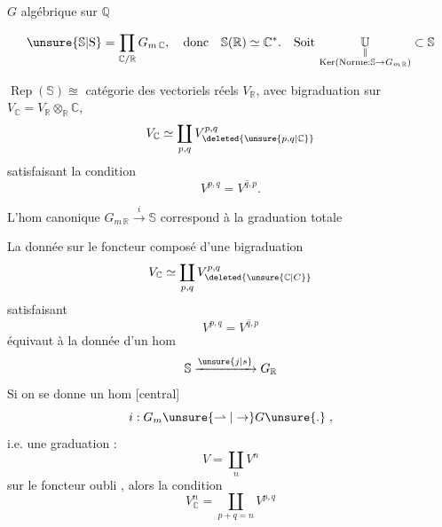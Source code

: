 $G$  algébrique sur $\mathbb{Q}$

\[
\unsure{\mathbb{S}|\mathrm{S}}=\prod_{\mathbb{C}/\mathbb{R}}G_{m\,\mathbb{C}},\quad
\text{donc}\quad \mathbb{S}(\mathbb{R})\simeq\mathbb{C}^{*}.\quad
\text{Soit }\underset{\substack{\Vert\\
\operatorname{Ker}(\mathrm{Norme}:\mathbb{S}\to G_{m\,\mathbb{R}})}}{\mathbb{U}}\subset\mathbb{S}
\]

$\operatorname{Rep}(\mathbb{S})\approxeq$ catégorie des vectoriels réels $V_{\mathbb{R}}$, avec bigraduation sur $V_{\mathbb{C}}=V_{\mathbb{R}}\otimes_{\mathbb{R}}\mathbb{C}$,
\[
V_{\mathbb{C}}\simeq\coprod_{p,q}V_{\deleted{\unsure{p,q|\mathbb{C}}}}^{p,q}
\]
satisfaisant la condition
\[
V^{p,q}=\overline{V^{q,p}}.
\]

L'hom canonique $G_{m\,\mathbb{R}}\xrightarrow{i}\mathbb{S}$ correspond à la graduation totale


La donnée sur le foncteur composé d'une bigraduation
\[
V_{\mathbb{C}}\simeq\coprod_{p,q}V_{\deleted{\unsure{\mathbb{C}|C}}}^{p,q}
\]
satisfaisant
\[
V^{p,q}=\overline{V^{q,p}}
\]
équivaut à la donnée d'un hom
\[
\mathbb{S}\xrightarrow{\unsure{j|s}}G_{\mathbb{R}}
\]
Si on se donne un hom [central]
\[
i:G_m\unsure{\rightharpoonup|\to}G\unsure{.}\;,
\]
i.e. une graduation :
\[
V=\coprod_n V^n
\]
sur le foncteur oubli , alors la condition
\[
V^n_{\mathbb{C}}=\coprod_{p+q=n}V^{p,q}
\]


